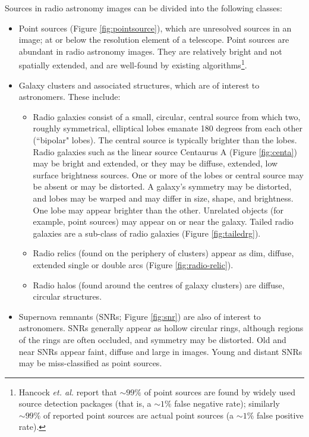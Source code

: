 Sources in radio astronomy images can be divided into the following classes:
\begin{itemize}
\item Point sources (Figure \ref{fig:pointsource}), which are unresolved sources in an image; at or below the resolution
element of a telescope. Point sources are abundant in radio astronomy images. They are relatively bright and not spatially extended, and are well-found by existing algorithms\footnote{Hancock \textit{et. al.} \cite{hancock2012compact} report that $\sim 99\%$ of point sources are found by widely used source detection packages (that is, a $\sim 1\%$ false negative rate); similarly $\sim 99\%$ of reported point sources are actual point sources (a $\sim 1\%$ false positive rate).}.
\item Galaxy clusters and associated structures, which are of interest to astronomers. These include:
	\begin{itemize}
	\item Radio galaxies consist of a small, circular, central source from which two, roughly symmetrical, elliptical lobes emanate 180 degrees from each other (``bipolar" lobes). The central source is typically brighter than the lobes. Radio galaxies such as the linear source Centaurus A (Figure \ref{fig:centa}) may be bright and extended, or they may be diffuse, extended, low surface brightness sources. One or more of the lobes or central source may be absent or may be distorted. A galaxy's symmetry may be distorted, and lobes may be warped and may differ in size, shape, and brightness. One lobe may appear brighter than the other. Unrelated objects (for example, point sources) may appear on or near the galaxy. Tailed radio galaxies are a sub-class of radio galaxies (Figure \ref{fig:tailedrg}). 
	\item Radio relics (found on the periphery of clusters) appear as dim, diffuse, extended single or double arcs (Figure \ref{fig:radio-relic}).
        \item Radio halos (found around the centres of galaxy clusters) are diffuse, circular structures.
	\end{itemize}
\item Supernova remnants (SNRs; Figure \ref{fig:snr}) are also of interest to astronomers. SNRs generally appear as hollow circular rings, although regions of the rings are often occluded, and symmetry may be distorted. Old and near SNRs appear faint, diffuse and large in images. Young and distant SNRs may be miss-classified as point sources.
\end{itemize}

